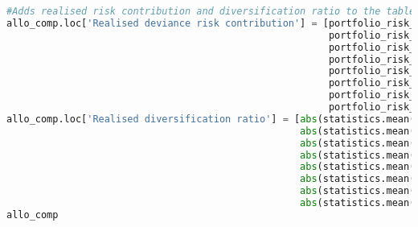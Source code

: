 \begin{lstlisting}[language=Python]
#Adds realised risk contribution and diversification ratio to the table
allo_comp.loc['Realised deviance risk contribution'] = [portfolio_risk_deviance(realisedRC_HRP),
                                                        portfolio_risk_deviance(realisedRC_HRP2),
                                                        portfolio_risk_deviance(realisedRC_IVP),
                                                        portfolio_risk_deviance(realisedRC_GMV),
                                                        portfolio_risk_deviance(realisedRC_GMVLO),
                                                        portfolio_risk_deviance(realisedRC_MD),
                                                        portfolio_risk_deviance(realisedRC_RP),
                                                        portfolio_risk_deviance(realisedRC_EW)]
allo_comp.loc['Realised diversification ratio'] = [abs(statistics.mean(realisedDR_HRP)),
                                                   abs(statistics.mean(realisedDR_HRP2)),
                                                   abs(statistics.mean(realisedDR_IVP)),
                                                   abs(statistics.mean(realisedDR_GMV)),
                                                   abs(statistics.mean(realisedDR_GMVLO)),
                                                   abs(statistics.mean(realisedDR_MD)),
                                                   abs(statistics.mean(realisedDR_RP)),
                                                   abs(statistics.mean(realisedDR_EW))]
allo_comp
\end{lstlisting}

